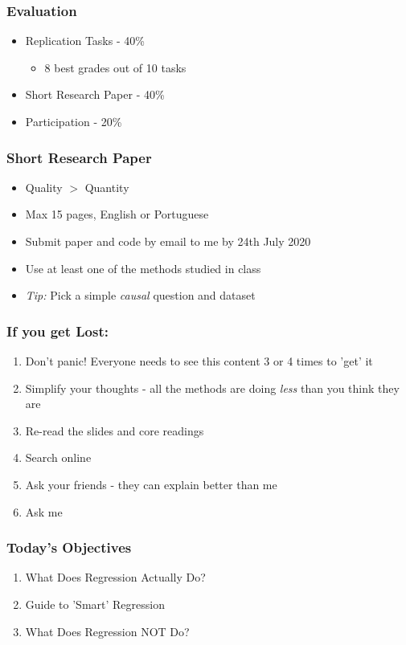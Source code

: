 \documentclass[xcolor=x11names,compress]{beamer}\usepackage[]{graphicx}\usepackage[]{color}
\renewcommand{\(}{\begin{columns}}
\renewcommand{\)}{\end{columns}}
\newcommand{\<}[1]{\begin{column}{#1}}
\renewcommand{\>}{\end{column}}
\begin{document}
\begin{frame}
\frametitle{Evaluation}
\begin{itemize}
\item Replication Tasks - 40\%
\pause
\begin{itemize}
\item 8 best grades out of 10 tasks
\end{itemize}
\pause
\item Short Research Paper - 40\%
\pause
\item Participation - 20\%
\end{itemize}
\end{frame}

\begin{frame}
\frametitle{Short Research Paper}
\begin{itemize}
\item Quality $>$ Quantity
\pause
\item Max 15 pages, English or Portuguese
\pause
\item Submit paper and code by email to me by 24th July 2020
\pause
\item Use at least one of the methods studied in class
\pause
\item \textit{Tip:} Pick a simple \textit{causal} question and dataset
\end{itemize}
\end{frame}

\begin{frame}
\frametitle{If you get Lost:}
\begin{enumerate}
\item Don't panic! Everyone needs to see this content 3 or 4 times to 'get' it
\pause
\item Simplify your thoughts - all the methods are doing \textit{less} than you think they are
\pause
\item Re-read the slides and core readings
\pause
\item Search online
\pause
\item Ask your friends - they can explain better than me
\pause
\item Ask me
\end{enumerate}
\end{frame}

\begin{frame}
\frametitle{Today's Objectives}
\begin{enumerate}
\item What Does Regression Actually Do?
\item Guide to 'Smart' Regression
\item What Does Regression NOT Do?
\end{enumerate}
\end{frame}
\end{document}

